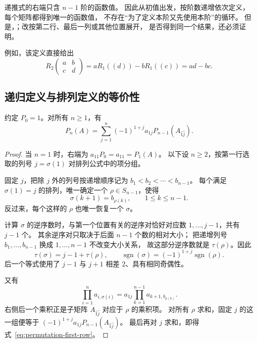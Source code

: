 \documentclass[UTF8,12pt,a4paper,fontset=fandol]{ctexart}
\begin{document}
递推式的右端只含 $n-1$ 阶的函数值。
因此从初值出发，按阶数递增依次定义，每个矩阵都得到唯一的函数值，
不存在“为了定义本阶又先使用本阶”的循环。
但是，；改按第二行、最后一列或其他位置展开，
是否得到同一个结果，还必须证明。

例如，该定义直接给出
\[
  R_2\!\begin{pmatrix}a&b\\c&d\end{pmatrix}
  =aR_1((d))-bR_1((c))=ad-bc.
\]

\subsection{递归定义与排列定义的等价性}

\begin{theorem}[排列公式满足第一行展开式]
\label{thm:first-row-expansion}
约定 $P_0=1$。对所有 $n\geq1$，有
\begin{equation}
  P_n(A)=\sum_{j=1}^{n}(-1)^{1+j}a_{1j}
  P_{n-1}(A_{\widehat1\widehat j}).
  \label{eq:permutation-first-row}
\end{equation}
\end{theorem}

\begin{proof}
当 $n=1$ 时，右端为 $a_{11}P_0=a_{11}=P_1(A)$。
以下设 $n\geq2$，按第一行选取的列号 $j=\sigma(1)$ 对排列公式中的项分组。

固定 $j$，把除 $j$ 外的列号按递增顺序记为
$b_1<b_2<\cdots<b_{n-1}$。
每个满足 $\sigma(1)=j$ 的排列，唯一确定一个 $\rho\in S_{n-1}$，使得
\[
  \sigma(k+1)=b_{\rho(k)},\qquad 1\leq k\leq n-1.
\]
反过来，每个这样的 $\rho$ 也唯一恢复一个 $\sigma$。

计算 $\sigma$ 的逆序数时，与第一个位置有关的逆序对恰好对应数
$1,\ldots,j-1$，共有 $j-1$ 个。
其余逆序对只取决于后面 $n-1$ 个数的相对大小；
把递增列号 $b_1,\ldots,b_{n-1}$ 换成 $1,\ldots,n-1$ 不改变大小关系，
故这部分逆序数就是 $\tau(\rho)$。因此
\[
  \tau(\sigma)=j-1+\tau(\rho),\qquad
  \operatorname{sgn}(\sigma)=(-1)^{1+j}\operatorname{sgn}(\rho).
\]
后一个等式使用了 $j-1$ 与 $j+1$ 相差 $2$、具有相同奇偶性。

又有
\[
  \prod_{i=1}^{n}a_{i,\sigma(i)}
  =a_{1j}\prod_{k=1}^{n-1}a_{k+1,b_{\rho(k)}}.
\]
右侧后一个乘积正是子矩阵 $A_{\widehat1\widehat j}$ 对应于 $\rho$ 的乘积项。
对所有 $\rho$ 求和，固定 $j$ 的这一组便等于
$(-1)^{1+j}a_{1j}P_{n-1}(A_{\widehat1\widehat j})$。
最后再对 $j$ 求和，即得式~\eqref{eq:permutation-first-row}。
\end{proof}
\end{document}
